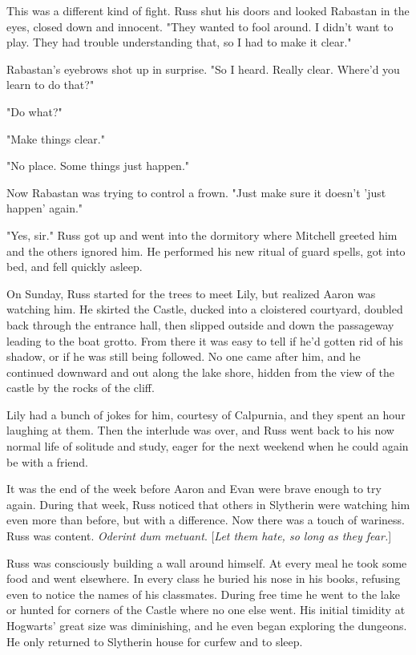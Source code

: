 \documentclass[a4paper,11pt]{article}
\begin{document}
This was a different kind of fight. Russ shut his doors and looked Rabastan in the eyes, closed down and innocent. "They wanted to fool around. I didn't want to play. They had trouble understanding that, so I had to make it clear."

Rabastan's eyebrows shot up in surprise. "So I heard. Really clear. Where'd you learn to do that?"

"Do what?"

"Make things clear."

"No place. Some things just happen."

Now Rabastan was trying to control a frown. "Just make sure it doesn't 'just happen' again."

"Yes, sir." Russ got up and went into the dormitory where Mitchell greeted him and the others ignored him. He performed his new ritual of guard spells, got into bed, and fell quickly asleep.

On Sunday, Russ started for the trees to meet Lily, but realized Aaron was watching him. He skirted the Castle, ducked into a cloistered courtyard, doubled back through the entrance hall, then slipped outside and down the passageway leading to the boat grotto. From there it was easy to tell if he'd gotten rid of his shadow, or if he was still being followed. No one came after him, and he continued downward and out along the lake shore, hidden from the view of the castle by the rocks of the cliff.

Lily had a bunch of jokes for him, courtesy of Calpurnia, and they spent an hour laughing at them. Then the interlude was over, and Russ went back to his now normal life of solitude and study, eager for the next weekend when he could again be with a friend.

It was the end of the week before Aaron and Evan were brave enough to try again. During that week, Russ noticed that others in Slytherin were watching him even more than before, but with a difference. Now there was a touch of wariness. Russ was content. \emph{Oderint dum metuant}. [\emph{Let them hate, so long as they fear.}]

Russ was consciously building a wall around himself. At every meal he took some food and went elsewhere. In every class he buried his nose in his books, refusing even to notice the names of his classmates. During free time he went to the lake or hunted for corners of the Castle where no one else went. His initial timidity at Hogwarts' great size was diminishing, and he even began exploring the dungeons. He only returned to Slytherin house for curfew and to sleep.
\end{document}

